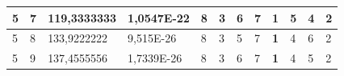 \documentclass[conference]{IEEEtran}
\begin{document}
\begin{table}[]
\begin{tabular}{|llll|llllllll|}
\multicolumn{1}{|l|}{5}                                                              & \multicolumn{1}{l|}{7}                                                                 & \multicolumn{1}{l|}{119,3333333}                                                           & 1,0547E-22                              & \multicolumn{1}{l|}{8}                                                           & \multicolumn{1}{l|}{3}                                                           & \multicolumn{1}{l|}{6}                                                           & \multicolumn{1}{l|}{7}                                                           & \multicolumn{1}{l|}{\textbf{1}}                                                  & \multicolumn{1}{l|}{5}                                                           & \multicolumn{1}{l|}{4}                                                           & 2                                   \\ \hline
\multicolumn{1}{|l|}{5}                                                              & \multicolumn{1}{l|}{8}                                                                 & \multicolumn{1}{l|}{133,9222222}                                                           & 9,515E-26                               & \multicolumn{1}{l|}{8}                                                           & \multicolumn{1}{l|}{3}                                                           & \multicolumn{1}{l|}{5}                                                           & \multicolumn{1}{l|}{7}                                                           & \multicolumn{1}{l|}{\textbf{1}}                                                  & \multicolumn{1}{l|}{4}                                                           & \multicolumn{1}{l|}{6}                                                           & 2                                   \\ \hline
\multicolumn{1}{|l|}{5}                                                              & \multicolumn{1}{l|}{9}                                                                 & \multicolumn{1}{l|}{137,4555556}                                                           & 1,7339E-26                              & \multicolumn{1}{l|}{8}                                                           & \multicolumn{1}{l|}{3}                                                           & \multicolumn{1}{l|}{6}                                                           & \multicolumn{1}{l|}{7}                                                           & \multicolumn{1}{l|}{\textbf{1}}                                                  & \multicolumn{1}{l|}{4}                                                           & \multicolumn{1}{l|}{5}                                                           & 2                                   \\ \hline

\end{tabular}
\end{table}
\end{document}
